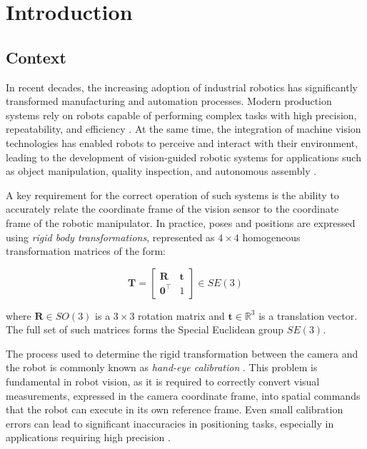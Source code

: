 \chapter{Introduction}
\label{sec:introduction}

\section{Context} 

In recent decades, the increasing adoption of industrial robotics has significantly
transformed manufacturing and automation processes. Modern production systems rely
on robots capable of performing complex tasks with high precision, repeatability,
and efficiency \cite{siciliano2009robotics}. At the same time, the integration of
machine vision technologies has enabled robots to perceive and interact with their
environment, leading to the development of vision-guided robotic systems for
applications such as object manipulation, quality inspection, and autonomous
assembly \cite{bradski2008learning}.

A key requirement for the correct operation of such systems is the ability to
accurately relate the coordinate frame of the vision sensor to the coordinate frame
of the robotic manipulator. In practice, poses and positions are expressed using
\textit{rigid body transformations}, represented as $4 \times 4$ homogeneous
transformation matrices of the form:

\begin{equation}
    \mathbf{T} = \begin{bmatrix} \mathbf{R} & \mathbf{t} \\ \mathbf{0}^{\top} & 1 \end{bmatrix}
    \in SE(3)
    \label{eq:homogeneous}
\end{equation}

\noindent where $\mathbf{R} \in SO(3)$ is a $3\times3$ rotation matrix and
$\mathbf{t} \in \mathbb{R}^3$ is a translation vector. The full set of such
matrices forms the Special Euclidean group $SE(3)$.

The process used to determine the rigid transformation between the camera and the
robot is commonly known as \textit{hand-eye calibration}
\cite{shiu1989calibration, tsai1989new}. This problem is fundamental in robot
vision, as it is required to correctly convert visual measurements, expressed in
the camera coordinate frame, into spatial commands that the robot can execute in
its own reference frame. Even small calibration errors can lead to significant
inaccuracies in positioning tasks, especially in applications requiring high
precision \cite{enebuse2021comparative}.

